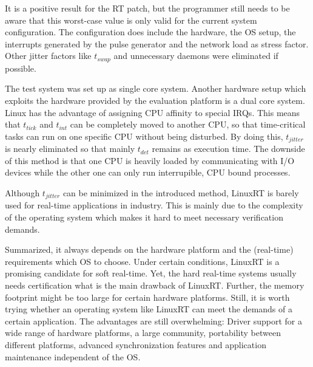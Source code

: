 It is a positive result for the RT patch, but the programmer still needs to be aware that this worst-case value is only valid for the current system configuration. 
The configuration does include the hardware, the \ac{OS} setup, the interrupts generated by the pulse generator and the network load as stress factor.
Other jitter factors like $t_{swap}$ and unnecessary daemons were eliminated if possible.
\par
The test system was set up as single core system.
Another hardware setup which exploits the hardware provided by the evaluation platform is a dual core system. 
Linux has the advantage of assigning \ac{CPU} affinity to special \acp{IRQ}.
This means that $t_{tick}$ and $t_{int}$ can be completely moved to another \ac{CPU}, so that time-critical tasks can run on one specific \ac{CPU} without being disturbed.
By doing this, $t_{jitter}$ is nearly eliminated so that mainly $t_{det}$ remains as execution time.
The downside of this method is that one \ac{CPU} is heavily loaded by communicating with \ac{I/O} devices while the other one can only run interrupible, \ac{CPU} bound processes.
\par
Although $t_{jitter}$ can be minimized in the introduced method, LinuxRT is barely used for real-time applications in industry.
This is mainly due to the complexity of the operating system which makes it hard to meet necessary verification demands.
\par
Summarized, it always depends on the hardware platform and the (real-time) requirements which \ac{OS} to choose.
Under certain conditions, LinuxRT is a promising candidate for soft real-time.
Yet, the hard real-time systems usually needs certification what is the main drawback of LinuxRT. 
Further, the memory footprint might be too large for certain hardware platforms. 
Still, it is worth trying whether an operating system like LinuxRT can meet the demands of a certain application.
The advantages are still overwhelming: Driver support for a wide range of hardware platforms, a large community, portability between different platforms, advanced synchronization features and application maintenance independent of the \ac{OS}.  


